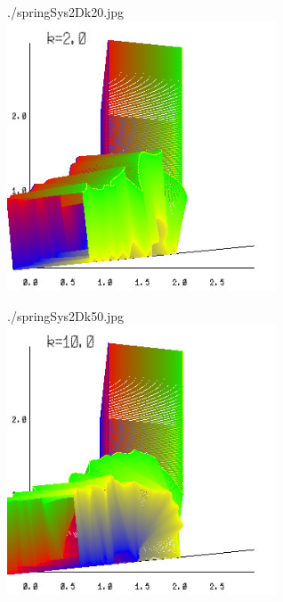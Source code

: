 \documentclass[12pt, a4paper]{article}
\begin{document}
\begin{center}
./springSys2Dk20.jpg\\
\includegraphics[width=8cm]{./springSys2Dk2.jpg}
\end{center} 
\newpage
\begin{center}
./springSys2Dk50.jpg\\
\includegraphics[width=8cm]{./springSys2Dk10.jpg}
\end{center} 
\end{document}
